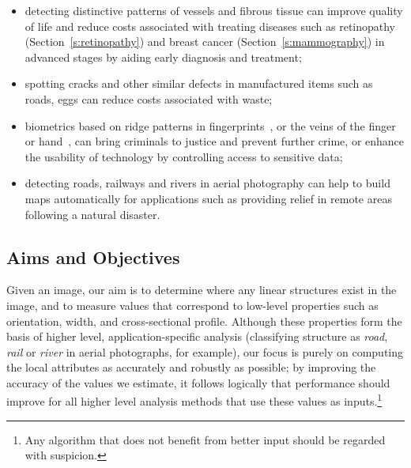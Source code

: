 \documentclass{IEEEtran}
\newcommand{\sref}[1]{Section~\ref{#1}}
\begin{document}
\begin{itemize}
\item detecting distinctive patterns of vessels and fibrous tissue can improve quality of life and reduce costs associated with treating diseases such as retinopathy (\sref{s:retinopathy}) and breast cancer (\sref{s:mammography}) in advanced stages by aiding early diagnosis and treatment; %
\item spotting cracks and other similar defects in manufactured items such as roads, eggs can reduce costs associated with waste; %
\item biometrics based on ridge patterns in fingerprints~\cite{}, or the veins of the finger~\cite{} or hand~\cite{}, can bring criminals to justice and prevent further crime, or enhance the usability of technology by controlling access to sensitive data; %
\item detecting roads, railways and rivers in aerial photography can help to build maps automatically for applications such as providing relief in remote areas following a natural disaster.
\end{itemize}


\subsection{Aims and Objectives}
Given an image, our aim is to determine where any linear structures exist in the image, and to measure values that correspond to low-level properties such as orientation, width, and cross-sectional profile. Although these properties form the basis of higher level, application-specific analysis (classifying structure as \emph{road}, \emph{rail} or \emph{river} in aerial photographs, for example), our focus is purely on computing the local attributes as accurately and robustly as possible; by improving the accuracy of the values we estimate, it follows logically that performance should improve for all higher level analysis methods that use these values as inputs.\footnote{Any algorithm that does not benefit from better input should be regarded with suspicion.}

\end{document}
